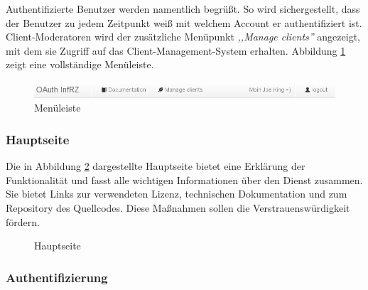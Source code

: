 \documentclass[12pt,a4paper,pointednumbers,abstracton]{scrartcl}
\begin{document}
Authentifizierte Benutzer werden namentlich begrüßt.
So wird sichergestellt, dass der Benutzer zu jedem Zeitpunkt weiß mit welchem Account er authentifiziert ist.
Client-Moderatoren wird der zusätzliche Menüpunkt \emph{,,Manage clients''} angezeigt, mit dem sie Zugriff auf das Client-Management-System erhalten.
Abbildung \ref{pic:oauth_infrz/navbar} zeigt eine vollständige Menüleiste.

\begin{figure}[h!]
\centering
\includegraphics[width=15cm]{img/oauth_infrz/navbar}
\caption{Menüleiste}
\label{pic:oauth_infrz/navbar}
\end{figure}

\subsubsection{Hauptseite}

Die in Abbildung \ref{pic:oauth_infrz/home} dargestellte Hauptseite bietet eine Erklärung der Funktionalität und fasst alle wichtigen Informationen über den Dienst zusammen.
Sie bietet Links zur verwendeten Lizenz, technischen Dokumentation und zum Repository des Quellcodes.
Diese Maßnahmen sollen die Verstrauenswürdigkeit fördern.

\begin{figure}[h!]
\centering
{}
\caption{Hauptseite}
\label{pic:oauth_infrz/home}
\end{figure}

\subsubsection{Authentifizierung}
\end{document}
